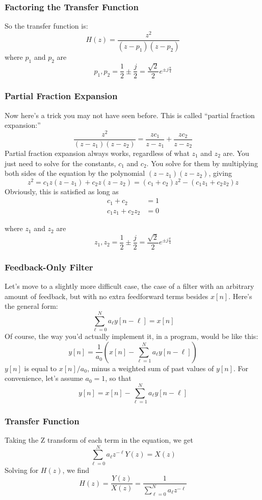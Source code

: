 \begin{frame}
  \frametitle{Factoring the Transfer Function}

  So the transfer function is:
  \[
  H(z) = \frac{z^2}{(z-p_1)(z-p_2)}
  \]
  where $p_1$ and $p_2$ are
  \[
  p_1,p_2 = \frac{1}{2}\pm \frac{j}{2} = \frac{\sqrt{2}}{2}e^{\pm j\frac{\pi}{4}}
  \]
\end{frame}

\begin{frame}
  \frametitle{Partial Fraction Expansion}

  Now here's a trick you may not have seen before.  This is called
  ``partial fraction expansion:''
  \[
  \frac{z^2}{(z-z_1)(z-z_2)} = \frac{zc_1}{z-z_1} + \frac{zc_2}{z-z_2}
  \]
  Partial fraction expansion always works, regardless of what $z_1$
  and $z_2$ are.  You just need to solve for the constants, $c_1$ and
  $c_2$.  You solve for them by multiplying both sides of the equation
  by the polynomial $(z-z_1)(z-z_2)$, giving
  \[
  z^2 = c_1z(z-z_1) + c_2z(z-z_2) = (c_1+c_2)z^2 - (c_1z_1+c_2z_2)z
  \]
  Obviously, this is satisfied as long as
  \begin{align*}
    c_1 + c_2 &= 1\\
    c_1z_1+c_2z_2 &= 0
  \end{align*}
  
  where $z_1$ and $z_2$ are
  \[
  z_1,z_2 = \frac{1}{2}\pm \frac{j}{2} = \frac{\sqrt{2}}{2}e^{\pm j\frac{\pi}{4}}
  \]
\end{frame}







\begin{frame}
  \frametitle{Feedback-Only Filter}

  Let's move to a slightly more difficult case, the case of a filter
  with an arbitrary amount of feedback, but with no extra feedforward
  terms besides $x[n]$.  Here's the general form:
  \[
  \sum_{\ell=0}^N a_\ell y[n-\ell] = x[n]
  \]
  Of course, the way you'd actually implement it, in a program, would be
  like this:
  \[
  y[n] = \frac{1}{a_0}\left(x[n] - \sum_{\ell=1}^N a_\ell y[n-\ell]\right)
  \]
  $y[n]$ is equal to $x[n]/a_0$, minus a weighted sum of past values
  of $y[n]$.  For convenience, let's assume $a_0=1$, so that
  \[
  y[n] = x[n] - \sum_{\ell=1}^N a_\ell y[n-\ell]
  \]
\end{frame}

\begin{frame}
  \frametitle{Transfer Function}

  Taking the Z transform of each term in the equation, we get
  \[
  \sum_{\ell=0}^N a_\ell z^{-\ell} Y(z) = X(z)
  \]
  Solving for $H(z)$, we find
  \[
  H(z) = \frac{Y(z)}{X(z)} = \frac{1}{\sum_{\ell=0}^N a_\ell z^{-\ell}}
  \]
\end{frame}

